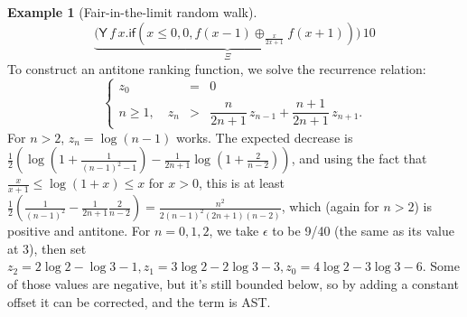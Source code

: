\documentclass{article}
\newcommand{\tY}{\mathsf{Y}}
\newcommand{\tif}[3]{\mathsf{if}(#1, #2, #3)} %
\theoremstyle{definition}
\newtheorem{example}{Example}
\theoremstyle{lemma}
\theoremstyle{remark}
\begin{document}
\begin{example}[Fair-in-the-limit random walk]
\label{ex:Fair-in-the-limit random walk}\citep[\S 5.3]{DBLP:journals/pacmpl/McIverMKK18}
\[
\underbrace{\big
(\tY \, f \, x . 
\tif{x \leq 0}{0}{f(x - 1) \oplus_{\frac{x}{2x+1}} f(x + 1)} \big)}_{\Xi} 
\, 10
\]
To construct an antitone ranking function, we solve the recurrence relation:
\[
\left\{
\begin{array}{rll}
z_0 &=& 0\\
n \geq 1, \quad z_n &>& \dfrac{n}{2n + 1} \, z_{n-1} + \dfrac{n+1}{2n + 1} \, z_{n+1}.
\end{array}
\right.
\]
For $n > 2$, $z_n = \log(n-1)$ works. The expected decrease is $\frac 1 2(\log(1+\frac 1 {(n-1)^2-1}) - \frac 1 {2n+1} \log(1 + \frac 2 {n-2}))$, and using the fact that $\frac x {x+1} \leq \log (1+x) \leq x$ for $x > 0$, this is at least $\frac 1 2(\frac 1 {(n-1)^2} - \frac 1 {2n + 1} \frac 2 {n-2}) = \frac {n^2}{2(n-1)^2(2n+1)(n-2)}$, which (again for $n > 2$) is positive and antitone. For $n = 0, 1, 2$, we take $\epsilon$ to be 9/40 (the same as its value at 3), then set $z_2 = 2 \log 2 - \log 3 - 1, z_1 = 3 \log 2 - 2 \log 3 - 3, z_0 = 4 \log 2 - 3 \log 3 - 6$. Some of those values are negative, but it's still bounded below, so by adding a constant offset it can be corrected, and the term is AST.

\end{example}
\end{document}
